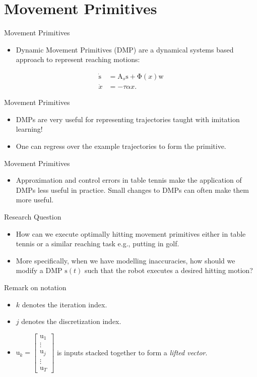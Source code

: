 \documentclass[handout]{beamer}
\newcommand{\boldvec}[1]{\boldsymbol{\mathrm{#1}}}
\let\vec\boldvec
\newcommand{\dmp}{\vec{s}} %
\newcommand{\sysInput}{\vec{u}} %
\newcommand{\phase}{x} %
\newcommand{\weights}{\vec{w}} %
\newcommand{\basis}{\vec{\Phi}} %
\begin{document}
\section{Movement Primitives}
%
\begin{frame}{Movement Primitives}
\begin{itemize}
\item Dynamic Movement Primitives (DMP) are a dynamical systems based approach to represent reaching motions:
\end{itemize}
\begin{equation}
\begin{aligned}
\dot{\dmp} &= \vec{A}_s \dmp + \basis(\phase) \weights \\
\dot{\phase} &= -\tau\alpha\phase.
\label{dmp1}
\end{aligned}
\end{equation}
\end{frame}
%
\begin{frame}{Movement Primitives}
\begin{itemize}
\item DMPs are very useful for representing trajectories taught with imitation learning! 
\item One can regress over the example trajectories to form the primitive.
\end{itemize}
\end{frame}
%
\begin{frame}{Movement Primitives}
\begin{itemize}
\item Approximation and control errors in table tennis make the application of DMPs less useful in practice. Small changes to DMPs can often make them more useful.
\end{itemize}
\end{frame}
%
\begin{frame}{Research Question}
\begin{itemize}
\item How can we execute optimally hitting movement primitives either in table tennis or a similar reaching task e.g., putting in golf. 
%
\item More specifically, when we have modelling inaccuracies, how should we modify a DMP $\dmp(t)$ such that the robot executes a desired hitting motion?
\end{itemize}
\end{frame}
%
\begin{frame}{Remark on notation}
\begin{itemize}
\item $k$ denotes the iteration index.
\item $j$ denotes the discretization index.
\item $\sysInput_k = \begin{bmatrix} \sysInput_1 \\ \vdots \\ \sysInput_j \\ \vdots \\ \sysInput_T \end{bmatrix}$ is inputs stacked  together to form a \emph{lifted vector}.
\end{itemize}
\end{frame}
%
\end{document}
